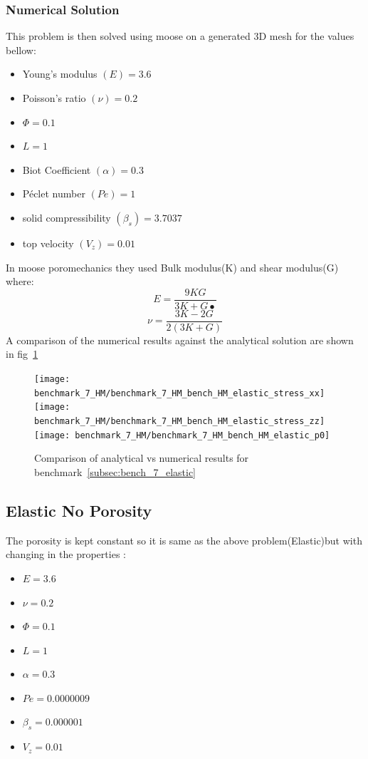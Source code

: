 \documentclass[]{scrreprt}
\begin{document}
\subsubsection{Numerical Solution} 

This problem is then solved using moose on a generated 3D mesh for the values bellow:
\begin{itemize}
\item Young's modulus $(E)=3.6$\
\item Poisson's ratio $(\nu) =0.2$\
\item $\Phi=0.1$\
\item $L=1$\
\item Biot Coefficient $(\alpha)=0.3$\
\item P\'{e}clet number $(Pe)=1$\
\item solid compressibility $(\beta_s)=3.7037$\
\item top velocity $(V_z) =0.01$\
\end{itemize}



In moose poromechanics they used  Bulk modulus(K) and shear modulus(G) where:\\

\begin{equation}
E=\frac{9KG}{3K+G•}
\end{equation}
\begin{equation}
\nu=\frac{3K-2G}{2(3K+G)}
\end{equation}
A comparison of the numerical results against the analytical solution are shown in fig~\ref{fig:benchmark7_Elastic}
\begin{figure}
  \centering
  \texttt{[image: benchmark\_7\_HM/benchmark\_7\_HM\_bench\_HM\_elastic\_stress\_xx]}
  \texttt{[image: benchmark\_7\_HM/benchmark\_7\_HM\_bench\_HM\_elastic\_stress\_zz]}
  \texttt{[image: benchmark\_7\_HM/benchmark\_7\_HM\_bench\_HM\_elastic\_p0]}
  \caption{Comparison of analytical vs numerical results for benchmark~\ref{subsec:bench_7_elastic}}
  \label{fig:benchmark7_Elastic}
\end{figure}
 
\subsection{Elastic No Porosity }
\label{subsec:bench_7_elastic_no_porosity}

The porosity is kept constant so it is same as the above problem(Elastic)but with changing in the properties :
\begin{itemize}
\item  $E=3.6$\
\item  $\nu =0.2$\
\item $\Phi=0.1$\
\item $L=1$\
\item  $\alpha=0.3$\
\item  $Pe=0.0000009$\
\item  $\beta_s=0.000001$\
\item  $V_z =0.01$\
\end{itemize}
\end{document}
